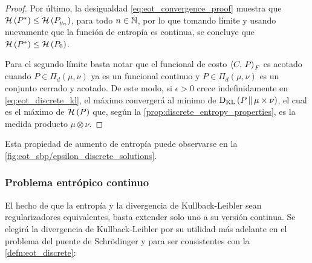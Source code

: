 \begin{proof}
	Por último, la desigualdad \eqref{eq:eot_convergence_proof} muestra que $\mathcal{H}\left(P^*\right)\leq\mathcal{H}\left(P_{y_n}\right)$, para todo $n\in\mathbb{N}$, por lo que tomando límite y usando nuevamente que la función de entropía es continua, se concluye que $\mathcal{H}\left(P^*\right)\leq\mathcal{H}\left(P_0\right)$.

	Para el segundo límite basta notar que el funcional de costo $\left\langle C,\,P\right\rangle_F$ es acotado cuando $P\in\Pi_d(\mu,\nu)$ ya es un funcional continuo y $P\in\Pi_d(\mu,\nu)$ es un conjunto cerrado y acotado. De este modo, si $\epsilon>0$ crece indefinidamente en \eqref{eq:eot_discrete_kl}, el máximo convergerá al mínimo de $\operatorname{D_{KL}}\left(P\,\|\,\mu\times\nu\right)$, el cual es el máximo de $\mathcal{H}\left(P\right)$ que, según la \autoref{prop:discrete_entropy_properties}, es la medida producto $\mu\otimes\nu$.
\end{proof}

Esta propiedad de aumento de entropía puede observarse en la \autoref{fig:eot_sbp/epsilon_discrete_solutions}.


\subsubsection{Problema entrópico continuo}

El hecho de que la entropía y la divergencia de Kullback-Leibler sean regularizadores equivalentes, basta extender solo uno a su versión continua. Se elegirá la divergencia de Kullback-Leibler por su utilidad más adelante en el problema del puente de Schrödinger y para ser consistentes con la \autoref{defn:eot_discrete}:


